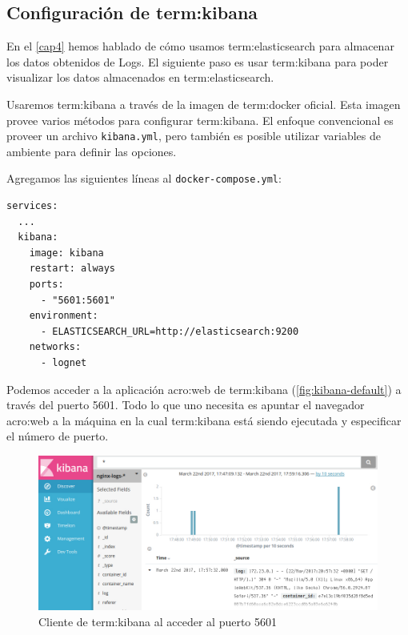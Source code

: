 \subsection{Configuración de \gls{term:kibana}}
\label{configuracion-de-kibana}

En el \autoref{cap4} hemos hablado de cómo usamos \gls{term:elasticsearch} para
almacenar los datos obtenidos de Logs. El siguiente paso es usar
\gls{term:kibana} para poder visualizar los datos almacenados en
\gls{term:elasticsearch}.

Usaremos \gls{term:kibana} a través de la imagen de \gls{term:docker} oficial.
Esta imagen provee varios métodos para configurar \gls{term:kibana}. El enfoque
convencional es proveer un archivo \lstinline{kibana.yml}, pero también es
posible utilizar variables de ambiente para definir las opciones.

Agregamos las siguientes líneas al \lstinline{docker-compose.yml}:

\begin{lstlisting}
services:
  ...
  kibana:
    image: kibana
    restart: always
    ports:
      - "5601:5601"
    environment:
      - ELASTICSEARCH_URL=http://elasticsearch:9200
    networks:
      - lognet
\end{lstlisting}

Podemos acceder a la aplicación \gls{acro:web} de \gls{term:kibana}
(\autoref{fig:kibana-default}) a través del puerto 5601. Todo lo que uno
necesita es apuntar el navegador \gls{acro:web} a la máquina en la cual
\gls{term:kibana} está siendo ejecutada y especificar el número de puerto.

\begin{figure}
  \includegraphics[width=\linewidth]{src/images/05-capitulo-5/kibanadefault.jpg}
  \caption{Cliente de \gls{term:kibana} al acceder al puerto 5601}
  \label{fig:kibana-default}
\end{figure}

